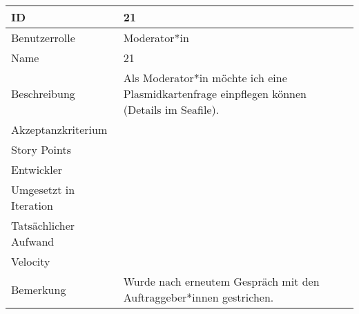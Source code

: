 \begin{tabularx}{\textwidth}{|p{}|X|}
	\hline
	ID & 21\\
	\hline
	Benutzerrolle & Moderator*in\\
	\hline
	Name & 21\\
	\hline
	Beschreibung & Als Moderator*in möchte ich eine Plasmidkartenfrage einpflegen können (Details im Seafile).\\
	\hline
	Akzeptanzkriterium & \\
	\hline
	Story Points & \\
	\hline
	Entwickler & \\
	\hline
	Umgesetzt in Iteration & \\
	\hline
	Tatsächlicher Aufwand & \\
	\hline
	Velocity & \\
	\hline
	Bemerkung & Wurde nach erneutem Gespräch mit den Auftraggeber*innen gestrichen.\\
	\hline
\end{tabularx}
\vspace{20pt}
